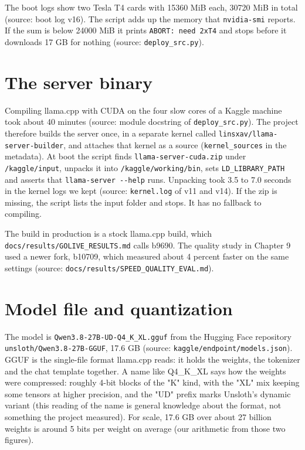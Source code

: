 The boot logs show two Tesla T4 cards with 15360 MiB each, 30720 MiB in total (source: boot log v16). The script adds up the memory that \texttt{nvidia-\allowbreak{}smi} reports. If the sum is below 24000 MiB it prints \texttt{ABORT:\allowbreak{} need 2xT4} and stops before it downloads 17 GB for nothing (source: \texttt{deploy\_\allowbreak{}src.\allowbreak{}py}).

\section{The server binary}

Compiling llama.cpp with CUDA on the four slow cores of a Kaggle machine took about 40 minutes (source: module docstring of \texttt{deploy\_\allowbreak{}src.\allowbreak{}py}). The project therefore builds the server once, in a separate kernel called \texttt{linsxav/\allowbreak{}llama-\allowbreak{}server-\allowbreak{}builder}, and attaches that kernel as a source (\texttt{kernel\_\allowbreak{}sources} in the metadata). At boot the script finds \texttt{llama-\allowbreak{}server-\allowbreak{}cuda.\allowbreak{}zip} under \texttt{/\allowbreak{}kaggle/\allowbreak{}input}, unpacks it into \texttt{/\allowbreak{}kaggle/\allowbreak{}working/\allowbreak{}bin}, sets \texttt{LD\_\allowbreak{}LIBRARY\_\allowbreak{}PATH} and asserts that \texttt{llama-\allowbreak{}server -\allowbreak{}-\allowbreak{}help} runs. Unpacking took 3.5 to 7.0 seconds in the kernel logs we kept (source: \texttt{kernel.\allowbreak{}log} of v11 and v14). If the zip is missing, the script lists the input folder and stops. It has no fallback to compiling.

The build in production is a stock llama.cpp build, which \texttt{docs/\allowbreak{}results/\allowbreak{}GOLIVE\_\allowbreak{}RESULTS.\allowbreak{}md} calls b9690. The quality study in Chapter 9 used a newer fork, b10709, which measured about 4 percent faster on the same settings (source: \texttt{docs/\allowbreak{}results/\allowbreak{}SPEED\_\allowbreak{}QUALITY\_\allowbreak{}EVAL.\allowbreak{}md}).

\section{Model file and quantization}

The model is \texttt{Qwen3.\allowbreak{}8-\allowbreak{}27B-\allowbreak{}UD-\allowbreak{}Q4\_\allowbreak{}K\_\allowbreak{}XL.\allowbreak{}gguf} from the Hugging Face repository \texttt{unsloth/\allowbreak{}Qwen3.\allowbreak{}8-\allowbreak{}27B-\allowbreak{}GGUF}, 17.6 GB (source: \texttt{kaggle/\allowbreak{}endpoint/\allowbreak{}models.\allowbreak{}json}). GGUF is the single-file format llama.cpp reads: it holds the weights, the tokenizer and the chat template together. A name like Q4\_\allowbreak{}K\_\allowbreak{}XL says how the weights were compressed: roughly 4-bit blocks of the "K" kind, with the "XL" mix keeping some tensors at higher precision, and the "UD" prefix marks Unsloth's dynamic variant (this reading of the name is general knowledge about the format, not something the project measured). For scale, 17.6 GB over about 27 billion weights is around 5 bits per weight on average (our arithmetic from those two figures).

